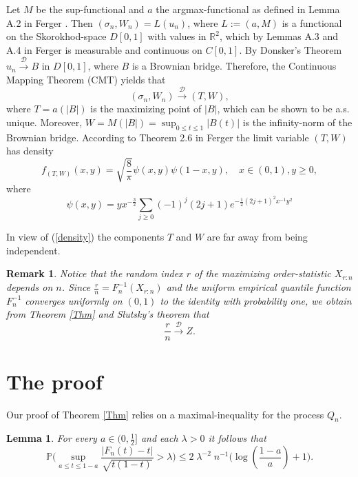 \documentclass[sn-mathphys,Numbered]{sn-jnl}%
\theoremstyle{thmstyleone}%
\theoremstyle{thmstyletwo}%
\newtheorem{remark}{Remark}%
\newtheorem{lemma}{Lemma}%
\theoremstyle{thmstylethree}%
\begin{document}
Let $M$ be the sup-functional and $a$ the argmax-functional as defined in Lemma A.2 in Ferger \cite{Ferger1}. Then $(\sigma_n,W_n)= L(u_n)$, where $L:=(a,M)$ is a functional on the Skorokhod-space $D[0,1]$ with values in $\mathbb{R}^2$, which by Lemmas A.3 and A.4 in Ferger \cite{Ferger1} is measurable and continuous on $C[0,1]$. By Donsker's Theorem $u_n \stackrel{\mathcal{D}}{\rightarrow} B$ in $D[0,1]$, where $B$ is a Brownian bridge. Therefore, the Continuous Mapping Theorem (CMT) yields that
$$
 (\sigma_n,W_n) \stackrel{\mathcal{D}}{\rightarrow} (T,W),
$$
where $T=a(|B|)$ is the maximizing point of $|B|$, which can be shown to be a.s. unique. Moreover, $W=M(|B|)=\sup_{0 \le t \le 1}|B(t)|$ is the infinity-norm of the Brownian bridge.
According to Theorem 2.6 in  Ferger  \cite{Ferger0} the limit variable $(T,W)$ has density
\begin{equation} \label{density}
 f_{(T,W)}(x,y) = \sqrt{\frac{8}{\pi}} \psi(x,y) \psi(1-x,y),\quad x \in (0,1), y \ge 0,
\end{equation}
where
$$
 \psi(x,y) = y x^{-\frac{3}{2}} \sum_{j \ge 0} (-1)^j (2j+1) e^{-\frac{1}{2} (2j+1)^2 x^{-1}y^2}
$$

In view of (\ref{density}) the components $T$ and $W$ are far away from being independent.\\



\begin{remark}
Notice that the random index $r$ of the maximizing order-statistic $X_{r:n}$ depends on $n$. Since $\frac{r}{n} = F_n^{-1}(X_{r:n})$ and the uniform empirical quantile function $F_n^{-1}$ converges uniformly on $(0,1)$ to the identity with probability one, we obtain from Theorem \ref{Thm} and Slutsky's theorem that
$$
 \frac{r}{n} \stackrel{\mathcal{D}}{\rightarrow} Z.
$$
\end{remark}

\section{The proof}
Our proof of Theorem \ref{Thm} relies on a maximal-inequality for the process $Q_n$.\\

\begin{lemma} \label{maxinequalityQn} For every $a \in (0,\frac{1}{2}]$ and each $\lambda>0$ it follows that
\begin{equation} \label{maxinequality}
\mathbb{P}\big(\sup_{a \le t \le 1-a} \frac{|F_n(t)-t|}{\sqrt{t(1-t)}} > \lambda \big) \le 2 \; \lambda^{-2} \; n^{-1} \big(\log(\frac{1-a}{a})+1\big).
\end{equation}
\end{lemma}
\end{document}

